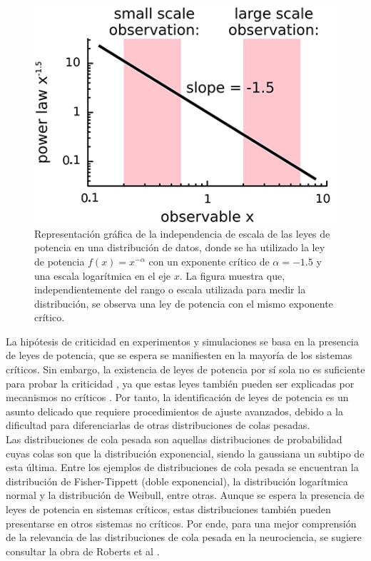 \begin{figure}[ht]
	\centering\includegraphics[width=\imsize]{fnsys-08-00166-g003.jpg}
	\caption[Representación gráfica de la independencia de escala de las leyes de potencia en una distribución de datos.]{Representación gráfica de la independencia de escala de las leyes de potencia en una distribución de datos, donde se ha utilizado la ley de potencia $f(x) = x^{-\alpha}$  con un exponente crítico de $\alpha=-1.5$ y una escala logarítmica en el eje $x$. La figura muestra que, independientemente del rango o escala utilizada para medir la distribución, se observa una ley de potencia con el mismo exponente crítico.} 	\label{fig:leypotencia}
\end{figure}


La hipótesis de criticidad en experimentos y simulaciones se basa en la presencia de leyes de potencia, que se espera se manifiesten en la mayoría de los sistemas críticos. Sin embargo, la existencia de leyes de potencia por sí sola no es suficiente para probar la criticidad \cite{goldstein_problems_2004,priesemann_can_2018}, ya que estas leyes también pueden ser explicadas por mecanismos no críticos \cite{touboul_can_2010,markovic_power_2014,noauthor_critical_2006,beggs_being_2012}. Por tanto, la identificación de leyes de potencia es un asunto delicado que requiere procedimientos de ajuste avanzados, debido a la dificultad para diferenciarlas de otras distribuciones de colas pesadas.\\

Las distribuciones de cola pesada son aquellas distribuciones de probabilidad cuyas colas son  que la distribución exponencial, siendo la gaussiana un subtipo de esta última. Entre los ejemplos de distribuciones de cola pesada se encuentran la distribución de Fisher-Tippett (doble exponencial), la distribución logarítmica normal y la distribución de Weibull, entre otras. Aunque se espera la presencia de leyes de potencia en sistemas críticos, estas distribuciones también pueden presentarse en otros sistemas no críticos. Por ende, para una mejor comprensión de la relevancia de las distribuciones de cola pesada en la neurociencia, se sugiere consultar la obra de Roberts et al  \cite{roberts_heavy_2015}.\\

